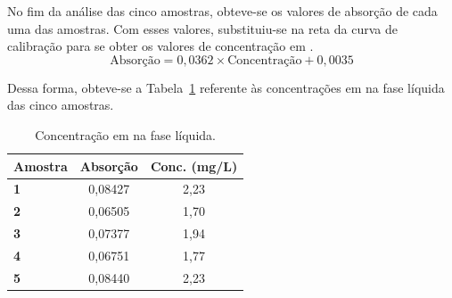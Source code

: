 No fim da análise das cinco amostras, obteve-se os valores de absorção de cada uma das amostras.
Com esses valores, substituiu-se na reta da curva de calibração para se obter os valores de concentração em .
\[
    \text{Absorção} = 0,0362 \times \text{Concentração} + 0,0035
\]

Dessa forma, obteve-se a Tabela~\ref{tab:concentracao-au-fase-liquida} referente às concentrações em  na fase líquida das cinco amostras.

\begin{table}[!ht]
    \centering
    \begin{tabular}{@{}lcc@{}}
        \toprule
        \textbf{Amostra} & \textbf{Absorção} & \textbf{Conc. (mg/L)} \\ \midrule
        \textbf{1} & 0,08427 & 2,23 \\
        \textbf{2} & 0,06505 & 1,70 \\
        \textbf{3} & 0,07377 & 1,94 \\
        \textbf{4} & 0,06751 & 1,77 \\
        \textbf{5} & 0,08440 & 2,23 \\ \bottomrule
    \end{tabular}
    \caption{Concentração em  na fase líquida.}
    \label{tab:concentracao-au-fase-liquida}
\end{table}

\hrulefill

